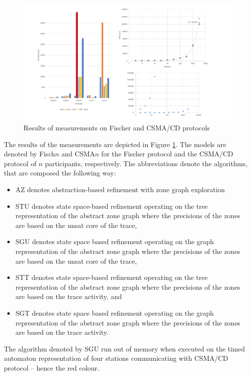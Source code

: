\begin{figure}
	\centering
	\includegraphics[width=\textwidth]{include/figures/diag_fischcsma}
	\caption{Results of measurements on Fischer and CSMA/CD protocols}
	\label{fig:mesurements}
\end{figure}

The results of the measurements are depicted in Figure \ref{fig:mesurements}. The models are denoted by Fisch$n$ and CSMA$n$ for the Fischer protocol and the CSMA/CD protocol of $n$ participants, respectively. The abbreviations denote the algorithms, that are composed the following way:

\begin{itemize}
	\item AZ denotes abstraction-based refinement with zone graph exploration
	\item STU denotes state space-based refinement operating on the tree representation of the abstract zone graph where the precisions of the zones are based on the unsat core of the trace,
	\item SGU denotes state space based refinement operating on the graph representation of the abstract zone graph where the precisions of the zones are based on the unsat core of the trace,
	\item STT denotes state space-based refinement operating on the tree representation of the abstract zone graph where the precisions of the zones are based on the trace activity, and
	\item SGT denotes state space based refinement operating on the graph representation of the abstract zone graph where the precisions of the zones are based on the trace activity.
\end{itemize}

The algorithm denoted by SGU run out of memory when executed on the timed automaton representation of four stations communicating with CSMA/CD protocol -- hence the red colour.

